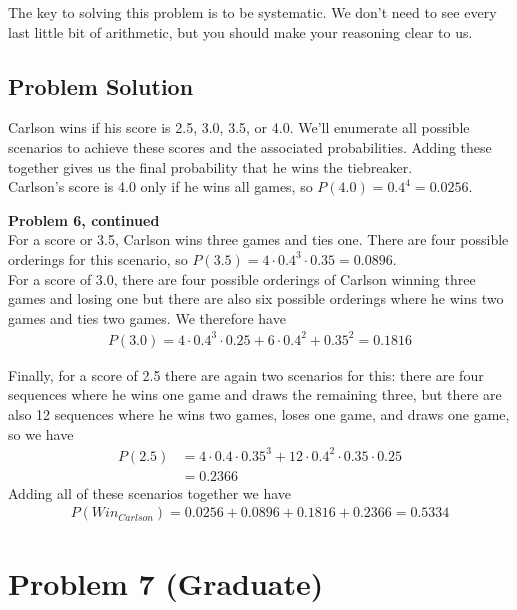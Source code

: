\documentclass[12pt]{article}
\theoremstyle{definition}
\begin{document}
\bigskip
The key to solving this problem is to be systematic. We don't need to see every last little bit of arithmetic, but you should make your reasoning clear to us.


\subsection*{Problem Solution}

Carlson wins if his score is 2.5, 3.0, 3.5, or 4.0. We'll enumerate all possible scenarios to achieve these scores and the associated probabilities. Adding these together gives us the final probability that he wins the tiebreaker.\\

Carlson's score is 4.0 only if he wins all games, so $P(4.0) = 0.4^4 = 0.0256$.

\newpage
\noindent
{\bf Problem 6, continued}\\

For a score or 3.5, Carlson wins three games and ties one. There are four possible orderings for this scenario, so $P(3.5) = 4 \cdot 0.4^3 \cdot 0.35 = 0.0896$.\\

For a score of 3.0, there are four possible orderings of Carlson winning three games and losing one but there are also six possible orderings where he wins two games and ties two games. We therefore have
\begin{align*}
P(3.0) = 4 \cdot 0.4^3 \cdot 0.25 + 6 \cdot 0.4^2 + 0.35^2 = 0.1816
\end{align*}

Finally, for a score of 2.5 there are again two scenarios for this: there are four sequences where he wins one game and draws the remaining three, but there are also 12 sequences where he wins two games, loses one game, and draws one game, so we have
\begin{align*}
P(2.5) &= 4 \cdot 0.4 \cdot 0.35^3 + 12 \cdot 0.4^2 \cdot 0.35 \cdot 0.25\\
&= 0.2366
\end{align*}
Adding all of these scenarios together we have
\begin{align*}
P(Win_{Carlson}) = 0.0256 + 0.0896 + 0.1816 + 0.2366 = 0.5334
\end{align*}

\newpage
\section*{Problem 7 (Graduate)}
\end{document}
